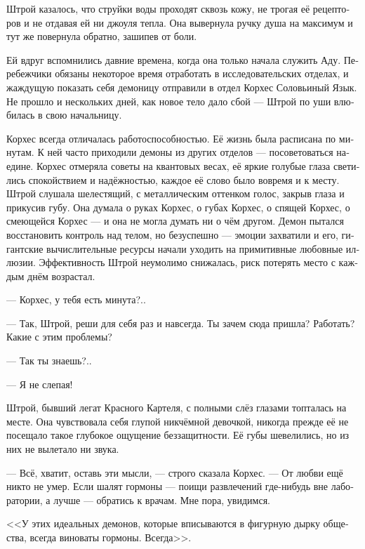 \documentclass[a4paper,12pt,fleqn]{book}\usepackage{polyglossia}\setdefaultlanguage[babelshorthands=true]{russian}\setotherlanguage{english}\defaultfontfeatures{Ligatures=TeX,Mapping=tex-text}\usepackage{xcolor}\newcommand{\ml}[3]{#2}
\begin{document}
{Штрой казалось, что струйки воды проходят сквозь кожу, не трогая её рецепторов и не отдавая ей ни джоуля тепла.
Она вывернула ручку душа на максимум и тут же повернула обратно, зашипев от боли.

Ей вдруг вспомнились давние времена, когда она только начала служить Аду.
Перебежчики обязаны некоторое время отработать в исследовательских отделах, и жаждущую показать себя демоницу отправили в отдел Корхес Соловьиный Язык.
Не прошло и нескольких дней, как новое тело дало сбой --- Штрой по уши влюбилась в свою начальницу.

Корхес всегда отличалась работоспособностью.
Её жизнь была расписана по минутам.
К ней часто приходили демоны из других отделов --- посоветоваться наедине.
Корхес отмеряла советы на квантовых весах, её яркие голубые глаза светились спокойствием и надёжностью, каждое её слово было вовремя и к месту.
Штрой слушала шелестящий, с металлическим оттенком голос, закрыв глаза и прикусив губу.
Она думала о руках Корхес, о губах Корхес, о спящей Корхес, о смеющейся Корхес --- и она не могла думать ни о чём другом.
Демон пытался восстановить контроль над телом, но безуспешно --- эмоции захватили и его, гигантские вычислительные ресурсы начали уходить на примитивные любовные иллюзии.
Эффективность Штрой неумолимо снижалась, риск потерять место с каждым днём возрастал.

--- Корхес, у тебя есть минута?..

\ml{$0-[ej]$}
{--- Так, Штрой, реши для себя раз и навсегда.}
{``Now, Stroji, make your choice once and for all.}
\ml{$0-[ej]$}
{Ты зачем сюда пришла?}
{Why are you here?}
\ml{$0-[ej]$}
{Работать?}
{Work?}
\ml{$0-[ej]$}
{Какие с этим проблемы?}
{You got a problem with that?}

\ml{$0-[ej]$}
{--- Так ты знаешь?..}
{``You knew ...!}

\ml{$0-[ej]$}
{--- Я не слепая!}
{``I'm not blind!''}

Штрой, бывший легат Красного Картеля, с полными слёз глазами топталась на месте.
Она чувствовала себя глупой никчёмной девочкой, никогда прежде её не посещало такое глубокое ощущение беззащитности.
Её губы шевелились, но из них не вылетало ни звука.

--- Всё, хватит, оставь эти мысли, --- строго сказала Корхес.
\ml{$0-[ej]$}
{--- От любви ещё никто не умер.}
{``Nobody's died of love.}
Если шалят гормоны --- поищи развлечений где-нибудь вне лаборатории, а лучше --- обратись к врачам.
Мне пора, увидимся.

<<У этих идеальных демонов, которые вписываются в фигурную дырку общества, всегда виноваты гормоны.
Всегда>>.

}
\end{document}
